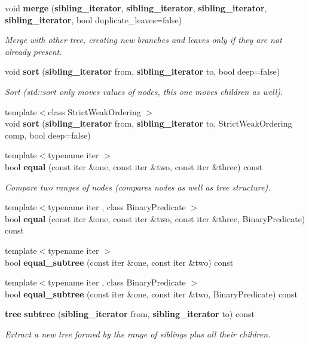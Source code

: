 \begin{DoxyCompactItemize}
void {\bf merge} ({\bf sibling\+\_\+iterator}, {\bf sibling\+\_\+iterator}, {\bf sibling\+\_\+iterator}, {\bf sibling\+\_\+iterator}, bool duplicate\+\_\+leaves=false)
\begin{DoxyCompactList}\small\item\em Merge with other tree, creating new branches and leaves only if they are not already present. \end{DoxyCompactList}\item 
void {\bf sort} ({\bf sibling\+\_\+iterator} from, {\bf sibling\+\_\+iterator} to, bool deep=false)
\begin{DoxyCompactList}\small\item\em Sort (std\+::sort only moves values of nodes, this one moves children as well). \end{DoxyCompactList}\item 
{\footnotesize template$<$class Strict\+Weak\+Ordering $>$ }\\void {\bf sort} ({\bf sibling\+\_\+iterator} from, {\bf sibling\+\_\+iterator} to, Strict\+Weak\+Ordering comp, bool deep=false)
\item 
{\footnotesize template$<$typename iter $>$ }\\bool {\bf equal} (const iter \&one, const iter \&two, const iter \&three) const 
\begin{DoxyCompactList}\small\item\em Compare two ranges of nodes (compares nodes as well as tree structure). \end{DoxyCompactList}\item 
{\footnotesize template$<$typename iter , class Binary\+Predicate $>$ }\\bool {\bf equal} (const iter \&one, const iter \&two, const iter \&three, Binary\+Predicate) const 
\item 
{\footnotesize template$<$typename iter $>$ }\\bool {\bf equal\+\_\+subtree} (const iter \&one, const iter \&two) const 
\item 
{\footnotesize template$<$typename iter , class Binary\+Predicate $>$ }\\bool {\bf equal\+\_\+subtree} (const iter \&one, const iter \&two, Binary\+Predicate) const 
\item 
{\bf tree} {\bf subtree} ({\bf sibling\+\_\+iterator} from, {\bf sibling\+\_\+iterator} to) const 
\begin{DoxyCompactList}\small\item\em Extract a new tree formed by the range of siblings plus all their children. \end{DoxyCompactList}\item 

\end{DoxyCompactItemize}
